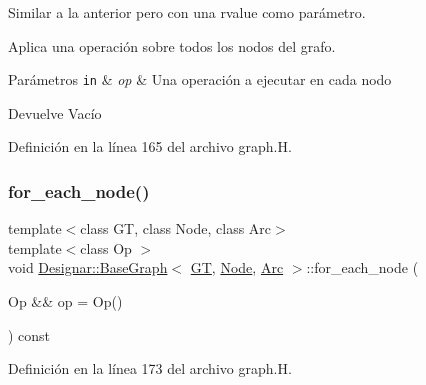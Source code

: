 Similar a la anterior pero con una rvalue como parámetro. 

Aplica una operación sobre todos los nodos del grafo.


\begin{DoxyParams}[1]{Parámetros}
\mbox{\tt in}  & {\em op} & Una operación a ejecutar en cada nodo \\
\hline
\end{DoxyParams}
\begin{DoxyReturn}{Devuelve}
Vacío 
\end{DoxyReturn}


Definición en la línea 165 del archivo graph.\+H.

\mbox{\label{class_designar_1_1_base_graph_aab8f765719514803f426b03939f519a1}} 
\subsubsection{\texorpdfstring{for\+\_\+each\+\_\+node()}{for\_each\_node()}\hspace{0.1cm}{\footnotesize\ttfamily [2/2]}}
{\footnotesize\ttfamily template$<$class GT, class Node, class Arc$>$ \\
template$<$class Op $>$ \\
void \hyperlink{class_designar_1_1_base_graph}{Designar\+::\+Base\+Graph}$<$ \hyperlink{demo-buildgraph_8_c_a3001c40d2c31ca87ed96cd7d1334a55e}{GT}, \hyperlink{namespace_designar_a5af326c65aa2bd26b26c410f2030d09e}{Node}, \hyperlink{namespace_designar_a3f55fb5513d62ff47cbc8f72b8e95d6f}{Arc} $>$\+::for\+\_\+each\+\_\+node (\begin{DoxyParamCaption}\item[{Op \&\&}]{op = {\ttfamily Op()} }\end{DoxyParamCaption}) const\hspace{0.3cm}{\ttfamily [inline]}}



Definición en la línea 173 del archivo graph.\+H.

\mbox{\label{class_designar_1_1_base_graph_a56b1ec4a0258d9f22542f33615bcdbea}} 

